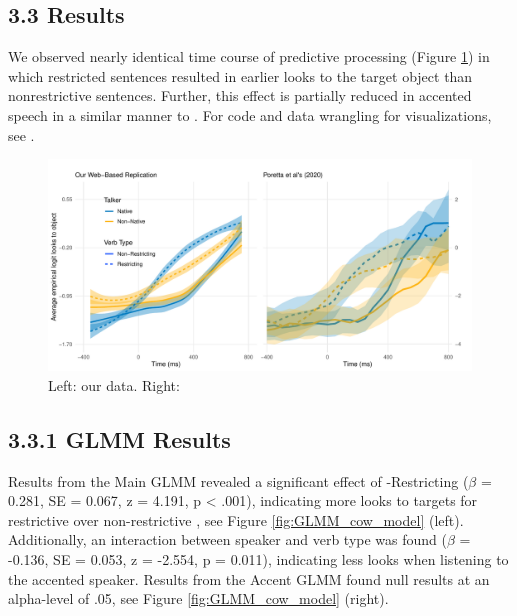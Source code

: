 

\subsection{3.3 Results}

 We observed nearly identical time course of predictive processing (Figure \ref{fig:smooth}) in which restricted sentences resulted in earlier looks to the target object than nonrestrictive sentences. Further, this effect is partially reduced in accented speech in a similar manner to \textcite{Porretta_et_al_2020}. For  code and data wrangling for visualizations, see .

\begin{figure}[h]
    \centering
    \includegraphics[width=\textwidth]{figures/smooth_comparison_plot.pdf}
    \caption{Left: our data. Right: \textcite{Porretta_et_al_2020}}
    \label{fig:smooth}
\end{figure}

\subsection{3.3.1 GLMM Results}
Results from the Main GLMM revealed a significant effect of  -Restricting  ($\beta$ = 0.281, SE = 0.067, z = 4.191, p < .001), indicating more looks to targets for restrictive  over non-restrictive , see Figure \ref{fig:GLMM_cow_model} (left). Additionally, an interaction between speaker and verb type was found ($\beta$ = -0.136, SE = 0.053, z = -2.554, p = 0.011), indicating less looks when listening to the accented speaker. Results from the Accent GLMM found null results at an alpha-level of .05, see Figure \ref{fig:GLMM_cow_model} (right). 

